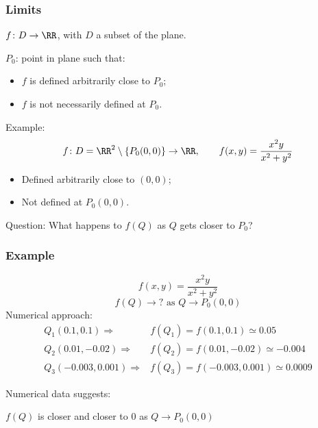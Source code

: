 \begin{frame}
  \frametitle{Limits}

  $f\colon D \to \RR$, with $D$ a subset of the plane.

  $P_0$: point in plane such that:
  \begin{itemize}
    \item $f$ is defined arbitrarily close to $P_0$;
    \item $f$ is not necessarily defined at $P_0$.
  \end{itemize}

  Example:
  $$f \colon D = \RR^2\setminus \{ P_0(0,0)\} \to \RR , \qquad f(x,y) = \frac{x^2y}{x^2+y^2}$$
  \begin{itemize}
    \item Defined arbitrarily close to $(0,0)$;
    \item Not defined at $P_0(0,0)$.
  \end{itemize}
  \pause
Question: What happens to $f(Q)$ as $Q$ gets closer to $P_0$?
\end{frame}

\begin{frame}
  \frametitle{Example}
  $$f(x,y) = \frac{x^2y}{x^2+y^2}$$
  $$f(Q) \to ? \text{ as } Q\to  P_0(0,0)$$
  \pause
  Numerical approach:
  \begin{align*}
    Q_1(0.1,0.1) \Longrightarrow & f(Q_1) = f(0.1,0.1) \simeq 0.05\\
    Q_2(0.01,-0.02) \Longrightarrow & f(Q_2) = f(0.01,-0.02) \simeq -0.004\\
    Q_3(-0.003,0.001) \Longrightarrow & f(Q_3) = f(-0.003,0.001) \simeq 0.0009
  \end{align*}

  Numerical data suggests: \pause
  \begin{center}
    $f(Q)$ is closer and closer to 0 as $Q \to P_0(0,0)$
  \end{center}
\end{frame}


